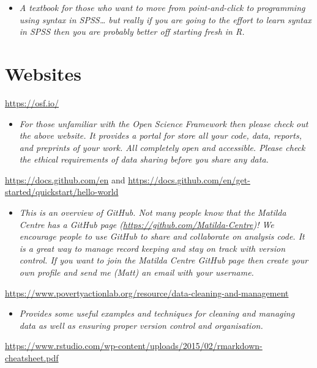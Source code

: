 \documentclass[
]{book}
\providecommand{\tightlist}{%
  \setlength{\itemsep}{0pt}\setlength{\parskip}{0pt}}
\begin{document}
\begin{itemize}
\tightlist
\item
  \emph{A textbook for those who want to move from point-and-click to programming using syntax in SPSS\ldots{} but really if you are going to the effort to learn syntax in SPSS then you are probably better off starting fresh in R.}
\end{itemize}

\hypertarget{websites}{%
\section{Websites}\label{websites}}

\url{https://osf.io/}

\begin{itemize}
\tightlist
\item
  \emph{For those unfamiliar with the Open Science Framework then please check out the above website. It provides a portal for store all your code, data, reports, and preprints of your work. All completely open and accessible. Please check the ethical requirements of data sharing before you share any data.}
\end{itemize}

\url{https://docs.github.com/en} and \url{https://docs.github.com/en/get-started/quickstart/hello-world}

\begin{itemize}
\tightlist
\item
  \emph{This is an overview of GitHub. Not many people know that the Matilda Centre has a GitHub page (\url{https://github.com/Matilda-Centre})! We encourage people to use GitHub to share and collaborate on analysis code. It is a great way to manage record keeping and stay on track with version control. If you want to join the Matilda Centre GitHub page then create your own profile and send me (Matt) an email with your username.}
\end{itemize}

\url{https://www.povertyactionlab.org/resource/data-cleaning-and-management}

\begin{itemize}
\tightlist
\item
  \emph{Provides some useful examples and techniques for cleaning and managing data as well as ensuring proper version control and organisation.}
\end{itemize}

\url{https://www.rstudio.com/wp-content/uploads/2015/02/rmarkdown-cheatsheet.pdf}
\end{document}

